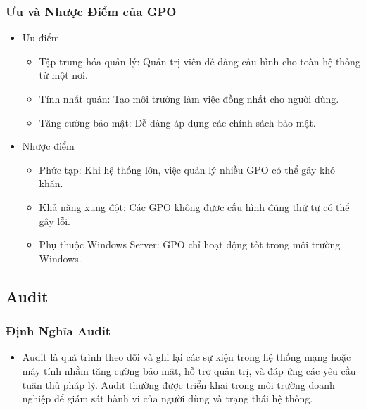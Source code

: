 \documentclass[13pt]{article}
\begin{document}
                \subsubsection{Ưu và Nhược Điểm của GPO}
                \begin{itemize}
                    \item Ưu điểm
                    \begin{itemize}
                        \item Tập trung hóa quản lý: Quản trị viên dễ dàng cấu hình cho toàn hệ thống từ một nơi.
                        \item Tính nhất quán: Tạo môi trường làm việc đồng nhất cho người dùng.
                        \item Tăng cường bảo mật: Dễ dàng áp dụng các chính sách bảo mật.
                        
                    \end{itemize}
    
                    \item Nhược điểm
                    \begin{itemize}
                        \item Phức tạp: Khi hệ thống lớn, việc quản lý nhiều GPO có thể gây khó khăn.
                        \item Khả năng xung đột: Các GPO không được cấu hình đúng thứ tự có thể gây lỗi.
                        \item Phụ thuộc Windows Server: GPO chỉ hoạt động tốt trong môi trường Windows.
                        
                    \end{itemize}
                    \end{itemize}
                
            \subsection{Audit}
                \subsubsection{Định Nghĩa Audit}
                \begin{itemize}
                \item Audit là quá trình theo dõi và ghi lại các sự kiện trong hệ thống mạng hoặc máy tính nhằm tăng cường bảo mật, hỗ trợ quản trị, và đáp ứng các yêu cầu tuân thủ pháp lý. Audit thường được triển khai trong môi trường doanh nghiệp để giám sát hành vi của người dùng và trạng thái hệ thống.
                \end{itemize}
\end{document}
